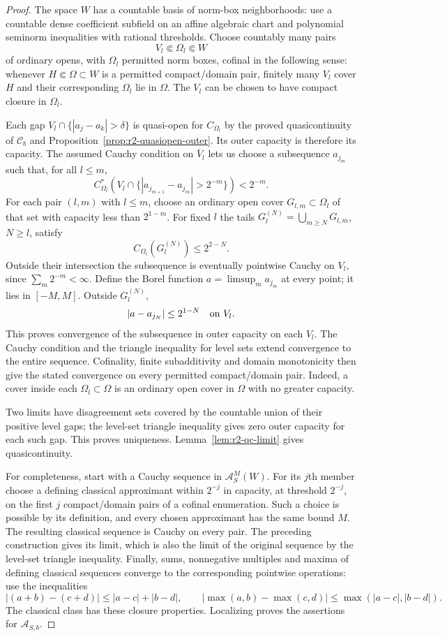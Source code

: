 \documentclass[11pt,a4paper]{article}
\numberwithin{equation}{section}
\theoremstyle{definition}
\theoremstyle{remark}
\newcommand{\Cb}{\mathcal C_b}
\begin{document}
\begin{proof}
The space $W$ has a countable basis of norm-box neighborhoods:
use a countable dense coefficient subfield on an affine algebraic
chart and polynomial seminorm inequalities with rational
thresholds. Choose countably many pairs
\[
 V_l\Subset\Omega_l\Subset W
\]
of ordinary opens, with $\Omega_l$ permitted norm boxes, cofinal
in the following sense: whenever $H\Subset\Omega\subset W$ is
a permitted compact/domain pair, finitely many $V_l$ cover $H$
and their corresponding $\Omega_l$ lie in $\Omega$.
The $V_l$ can be chosen to have compact closure in $\Omega_l$.

Each gap $V_l\cap\{|a_j-a_k|>\delta\}$ is quasi-open for
$C_{\Omega_l}$ by the proved quasicontinuity of $\Cb$ and
Proposition~\ref{prop:r2-quasiopen-outer}. Its outer capacity is
therefore its capacity. The assumed Cauchy condition on
$\overline V_l$ lets us choose a subsequence $a_{j_m}$ such that,
for all $l\leq m$,
\[
 C_{\Omega_l}^*(V_l\cap
       \{|a_{j_{m+1}}-a_{j_m}|>2^{-m}\})<2^{-m}.
\]
For each pair $(l,m)$ with $l\leq m$, choose an ordinary open
cover $G_{l,m}\subset\Omega_l$ of that set with capacity less
than $2^{1-m}$. For fixed $l$ the tails
$G_l^{(N)}=\bigcup_{m\geq N}G_{l,m}$, $N\geq l$, satisfy
\[
 C_{\Omega_l}(G_l^{(N)})\leq 2^{2-N}.
\]
Outside their intersection the subsequence is eventually pointwise
Cauchy on $V_l$, since $\sum_m2^{-m}<\infty$.
Define the Borel function $a=\limsup_m a_{j_m}$ at every point;
it lies in $[-M,M]$. Outside $G_l^{(N)}$,
\[
 |a-a_{j_N}|\leq 2^{1-N}\quad\hbox{on }V_l.
\]
This proves convergence of the subsequence in outer capacity on
each $V_l$. The Cauchy condition and the triangle inequality for
level sets extend convergence to the entire sequence. Cofinality,
finite subadditivity and domain monotonicity then give the stated
convergence on every permitted compact/domain pair. Indeed, a
cover inside each $\Omega_l\subset\Omega$ is an ordinary open
cover in $\Omega$ with no greater capacity.

Two limits have disagreement sets covered by the countable union
of their positive level gaps; the level-set triangle inequality
gives zero outer capacity for each such gap. This proves
uniqueness. Lemma~\ref{lem:r2-qc-limit} gives quasicontinuity.

For completeness, start with a Cauchy sequence in
$\mathcal A^M_S(W)$. For its $j$th member choose a defining
classical approximant within $2^{-j}$ in capacity, at threshold
$2^{-j}$, on the first $j$ compact/domain pairs of a cofinal
enumeration. Such a choice is possible by its definition, and
every chosen approximant has the same bound $M$. The resulting
classical sequence is Cauchy on every pair. The preceding
construction gives its limit, which is also the limit of the
original sequence by the level-set triangle inequality.
Finally, sums, nonnegative multiples and maxima of defining
classical sequences converge to the corresponding pointwise
operations: use the inequalities
\[
 |(a+b)-(c+d)|\leq|a-c|+|b-d|,
 \qquad |\max(a,b)-\max(c,d)|\leq\max(|a-c|,|b-d|).
\]
The classical class has these closure properties. Localizing
proves the assertions for $\mathcal A_{S,b}$.
\end{proof}
\end{document}
